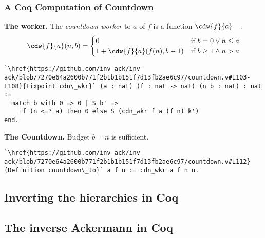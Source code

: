 \begin{frame}[fragile]
\frametitle{A Coq Computation of Countdown}

\textbf{The worker.}
The \emph{countdown worker}
to $a$ of $f$ is a function $\cdw{f}{a}$~~:
\begin{equation*}
\cdw{f}{a}(n, b) = \begin{cases}
0 & \text{if } b = 0 \vee n\le a \\ 1 +\cdw{f}{a}(f(n), b-1) & \text{if } b \ge 1 \wedge n > a
\end{cases}
\end{equation*}

\begin{lstlisting}
`\href{https://github.com/inv-ack/inv-ack/blob/7270e64a2600b771f2b1b1b151f7d13fb2ae6c97/countdown.v#L103-L108}{Fixpoint cdn\_wkr}` (a : nat) (f : nat -> nat) (n b : nat) : nat :=
  match b with 0 => 0 | S b' =>
    if (n <=? a) then 0 else S (cdn_wkr f a (f n) k')
end.
\end{lstlisting}

\bigskip

\pause 
\textbf{The Countdown.} Budget $b = n$ is sufficient.
\begin{lstlisting}
`\href{https://github.com/inv-ack/inv-ack/blob/7270e64a2600b771f2b1b1b151f7d13fb2ae6c97/countdown.v#L112}{Definition countdown\_to}` a f n := cdn_wkr a f n n.
\end{lstlisting}
\end{frame}


\begin{frame}
\frametitle{}
\end{frame}


\subsection{Inverting the hierarchies in Coq}

\subsection{The inverse Ackermann in Coq}
